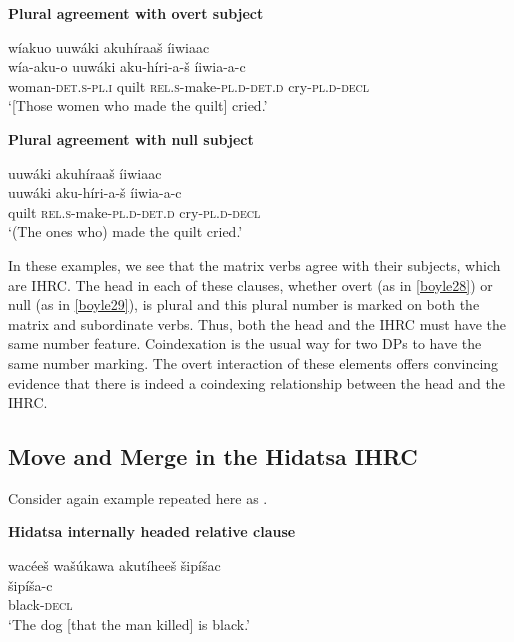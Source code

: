 \documentclass[output=paper]{LSP/langsci}
\begin{document}
\ea \textbf{Plural agreement with overt subject} \label{boyle28}

\glll w\'iakuo uuw\'aki akuh\'iraa\v{s} \'iiwiaac\\
w\'ia-aku-o  uuw\'aki aku-h\'iri-a-\v{s}    \'iiwia-a-c\\
woman-\textsc{det.s-pl.i}  quilt  \textsc{rel.s}-make-\textsc{pl.d-det.d} cry-\textsc{pl.d-decl}\\
\trans `[Those women who made the quilt] cried.'
\z

\ea \textbf{Plural agreement with null subject} \label{boyle29}

\glll uuw\'aki akuh\'iraa\v{s} \'iiwiaac\\
uuw\'aki aku-h\'iri-a-\v{s}   \'iiwia-a-c\\
quilt     \textsc{rel.s}-make-\textsc{pl.d}-\textsc{det.d} cry-\textsc{pl.d-decl}\\
\trans `(The ones who) made the quilt cried.'	
\z

In these examples, we see that the matrix verbs agree with their subjects, which are IHRC. The head in each of these clauses, whether overt (as in \ref{boyle28}) or null (as in \ref{boyle29}), is plural and this plural number is marked on both the matrix and subordinate verbs. Thus, both the head and the IHRC must have the same number feature. Coindexation is the usual way for two DPs to have the same number marking. The overt interaction of these elements offers convincing evidence that there is indeed a coindexing relationship between the head and the IHRC.  
	
\subsection{Move and Merge in the Hidatsa IHRC}\label{sec:boyle:5.4}

Consider again example  repeated here as .

\ea \textbf{Hidatsa internally headed relative clause} \label{boyle30}

\glll {\ob}wac\'ee\v{s} wa\v{s}\'ukawa akut\'ihee\v{s}{\cb} \v{s}ip\'i\v{s}ac\\
[wac\'ee-\v{s} wa\v{s}\'uka-wa aku-t\'i-hee-\v{s}] \v{s}ip\'i\v{s}a-c\\
[man-\textsc{det.d} dog-\textsc{det.i}  \textsc{rel.s}-die-\textsc{3.caus.d.sg-det.d}] black-\textsc{decl}\\
\trans `The dog [that the man killed] is black.' 
\z
\end{document}
